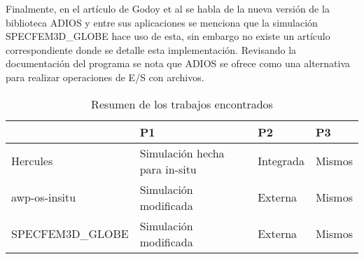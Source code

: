 Finalmente, en el artículo de Godoy et al \cite{Godoy2020} se habla de la nueva versión de la biblioteca ADIOS y entre sus aplicaciones se menciona que la simulación SPECFEM3D\_GLOBE \cite{Peter_Forward_and_adjoint_2011} hace uso de esta, sin embargo no existe un artículo correspondiente donde se detalle esta implementación. Revisando la documentación del programa se nota que ADIOS se ofrece como una alternativa para realizar operaciones de E/S con archivos.

\begin{table}[tbp]
    \begin{tabular}{|l|l|l|l|}
        \hline
                         & P1                            & P2        & P3     \\ \hline
        Hercules         & Simulación hecha para in-situ & Integrada & Mismos \\ \hline
        awp-os-insitu    & Simulación modificada         & Externa   & Mismos \\ \hline
        SPECFEM3D\_GLOBE & Simulación modificada         & Externa   & Mismos \\ \hline
    \end{tabular}
    \label{tab:related_work}
    \caption{Resumen de los trabajos encontrados}
\end{table}